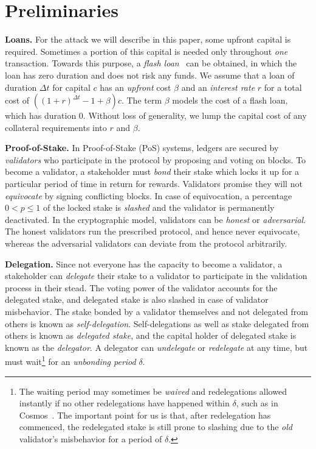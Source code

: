 \section{Preliminaries}\label{sec:preliminaries}


\noindent
\textbf{Loans.} For the attack we will describe in this paper, some upfront
capital is required. Sometimes a portion of this capital is needed only throughout \emph{one}
transaction. Towards this purpose, a \emph{flash loan}~\cite{gudgeon2020defi} can
be obtained, in which the loan has zero duration and does not risk any funds. We assume that
a loan of duration $\Delta t$ for capital $c$ has an \emph{upfront} cost $\beta$
and an \emph{interest rate} $r$ for a total cost of
$((1 + r)^{\Delta t} - 1 + \beta) c$. The term $\beta$ models the cost of a flash loan,
which has duration $0$. Without loss of generality, we lump the capital cost of any
collateral requirements into $r$ and $\beta$.

\noindent
\textbf{Proof-of-Stake.} In Proof-of-Stake (PoS) systems, ledgers are secured
by \emph{validators} who participate in the protocol by proposing and voting
on blocks. To become a validator, a stakeholder must \emph{bond} their stake
which locks it up for a particular period of time in return for rewards.
Validators promise they will
not \emph{equivocate} by signing conflicting blocks.
In case of equivocation, a percentage $0 < p \leq 1$ of the locked stake is
\emph{slashed} and the validator is permanently deactivated. In the cryptographic
model, validators can be \emph{honest} or \emph{adversarial}. The honest validators
run the prescribed protocol, and hence never equivocate, whereas the adversarial
validators can deviate from the protocol arbitrarily.


\noindent
\textbf{Delegation.} Since not everyone has the capacity to become a validator,
a stakeholder can \emph{delegate} their stake to a validator to participate in
the validation process in their stead. The voting power of the validator accounts
for the delegated stake, and delegated stake is also slashed in case of validator
misbehavior. The stake bonded by a validator themselves and not delegated from
others is known as \emph{self-delegation}. Self-delegations as
well as stake delegated from others is known as \emph{delegated stake},
and the capital holder of delegated stake is known as the \emph{delegator}.
A delegator can \emph{undelegate} or \emph{redelegate} at any time,
but must wait\footnote{The waiting period may sometimes be \emph{waived} and redelegations
allowed instantly if no other redelegations have happened within $\delta$, such as
in Cosmos~\cite{?}. The important point for us is that, after redelegation has commenced, the
redelegated stake is still prone to slashing due to the \emph{old} validator's misbehavior
for a period of $\delta$.} for an \emph{unbonding period} $\delta$.

